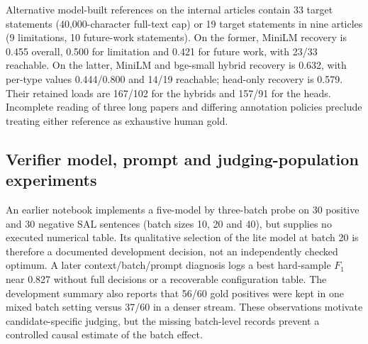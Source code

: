 Alternative model-built references on the internal articles contain 33 target statements
(40,000-character full-text cap) or 19 target statements in nine articles (9 limitations,
10 future-work statements). On the former, MiniLM recovery is 0.455 overall, 0.500 for limitation
and 0.421 for future work, with 23/33 reachable. On the latter, MiniLM and bge-small hybrid
recovery is 0.632, with per-type values 0.444/0.800 and 14/19 reachable; head-only recovery is
0.579. Their retained loads are 167/102 for the hybrids and 157/91 for the heads. Incomplete
reading of three long papers and differing annotation policies preclude treating either
reference as exhaustive human gold.

\subsection{Verifier model, prompt and judging-population experiments}
\label{A:verifiers}

\begin{table}[H]
\centering\small
\caption{Saved balanced hard-sample sweep: 120 detector candidates, 60 positive and 60 negative,
SAL keep-biased prompt, batches of 20. These selected-candidate results are not full-stream
extraction scores. Calls are the recorded counts, not dollar cost or latency.}
\label{T:verifier-sweep}

\end{table}

An earlier notebook implements a five-model by three-batch probe on 30 positive and 30 negative
SAL sentences (batch sizes 10, 20 and 40), but supplies no executed numerical table. Its qualitative
selection of the lite model at batch 20 is therefore a documented development decision, not an
independently checked optimum. A later context/batch/prompt diagnosis logs a best hard-sample
$F_1$ near 0.827 without full decisions or a recoverable configuration table. The development
summary also reports that 56/60 gold positives were kept in one mixed batch setting versus
37/60 in a denser stream. These observations motivate candidate-specific judging, but the
missing batch-level records prevent a controlled causal estimate of the batch effect.

\begin{table}[H]
\centering\small
\caption{Saved aggregate union-candidate runs. Strict SAL uses a different recorded judge/run
from the lite keep-biased variants; columns are not a controlled prompt-only ablation. Each
verifier run judged the union of 1,036 detector candidates before scoring a detector's subset.}
\label{T:union-runs}

\end{table}

